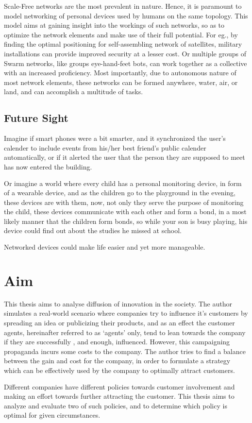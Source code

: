 Scale-Free networks are the most prevalent in nature. Hence, it is paramount to model networking of personal devices used by humans on the same topology. 
This model aims at gaining insight into the workings of such networks, so as to optimize the network elements and make use of their full potential. For eg., by finding the optimal positioning for self-assembling network of satellites, military installations can provide improved security at a lesser cost. Or multiple groups of Swarm networks, like groups eye-hand-feet bots, can work together as a collective with an increased proficiency.  Most importantly, due to autonomous nature of most network elements, these networks can be formed anywhere, water, air, or land, and can accomplish a multitude of tasks.

\subsection{Future Sight}

Imagine if smart phones were a bit smarter, and it synchronized the user's calender to include events from his/her best friend's public calender automatically, or if it alerted the user that the person they are supposed to meet has now entered the building.

Or imagine a world where every child has a personal monitoring device, in form of a wearable device, and as the children go to the playground in the evening, these devices are with them, now, not only they serve the purpose of monitoring the child, these devices communicate with each other and form a bond, in a most likely manner that the children form bonds, so while your son is busy playing, his device could find out about the studies he missed at school.

Networked devices could make life easier and yet more manageable.



\section{Aim}
This thesis aims to analyse diffusion of innovation in the society. 
The author simulates a real-world scenario where companies try to influence it's customers by spreading an idea or publicizing their products, and as an effect the customer agents, hereinafter referred to as `agents' only, tend to lean towards the company if they are successfully , and enough, influenced.
However, this campaigning propaganda incurs some costs to the company. The author tries to find a balance between the gain and cost for the company, in order to formulate a strategy which can be effectively used by the company to optimally attract customers. 

Different companies have different policies towards customer involvement and making an effort towards further attracting the customer. This thesis aims to analyze and evaluate two of such policies, and to determine which policy is optimal for given circumstances.
